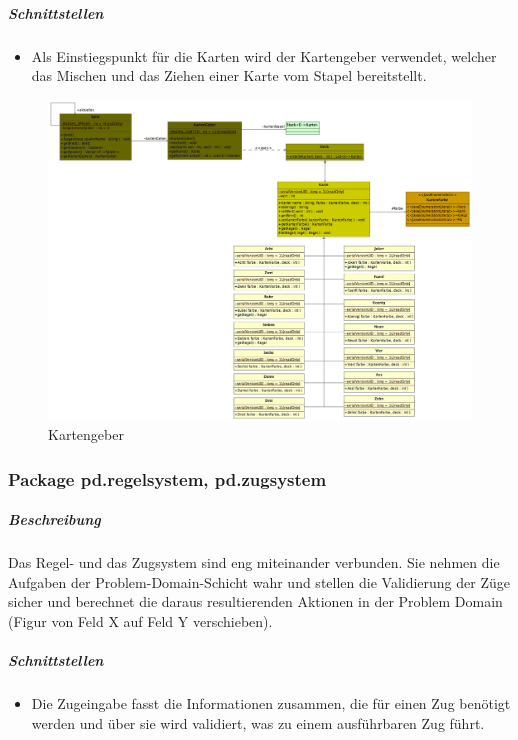 \documentclass[12pt,halfparskip]{scrartcl}
\begin{document}
\subparagraph{Schnittstellen} %
\label{ssub:schnittstellen}
\begin{itemize}
	\item Als Einstiegspunkt für die Karten wird der Kartengeber verwendet, welcher das Mischen und das Ziehen einer Karte vom Stapel bereitstellt.
\end{itemize}

\begin{figure}[h]
	\centering
	\includegraphics[width=0.8 \textwidth]{pd_kartengeber}
	\caption{Kartengeber}
	\label{fig:pd_kartengeber}
\end{figure}


\clearpage
\subsubsection{Package pd.regelsystem, pd.zugsystem} %
\label{ssub:package_pd_regelsystem}
\subparagraph{Beschreibung}
Das Regel- und das Zugsystem sind eng miteinander verbunden. Sie nehmen die Aufgaben der Problem-Domain-Schicht wahr und stellen die Validierung der Züge sicher und berechnet die daraus resultierenden Aktionen in der Problem Domain (Figur von Feld X auf Feld Y verschieben).

\subparagraph{Schnittstellen} %
\label{ssub:schnittstellen}
\begin{itemize}
	\item Die Zugeingabe fasst die Informationen zusammen, die für einen Zug benötigt werden und über sie wird validiert, was zu einem ausführbaren Zug führt.
\end{itemize}
\end{document}
